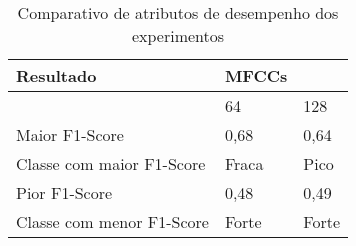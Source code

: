 
\begin{table}[]
    \centering
    \begin{tabular}{|l|l|l|}
    \hline
        Resultado & MFCCs & ~ \\ \hline
        ~ & 64 & 128 \\ \hline
        Maior F1-Score & 0,68 & 0,64 \\ \hline
        Classe com maior F1-Score & Fraca & Pico \\ \hline
        Pior F1-Score & 0,48 & 0,49 \\ \hline
        Classe com menor F1-Score & Forte & Forte \\ \hline
    \end{tabular}
    \caption{\label{table:compexp}Comparativo de atributos de desempenho dos experimentos}
\end{table}

